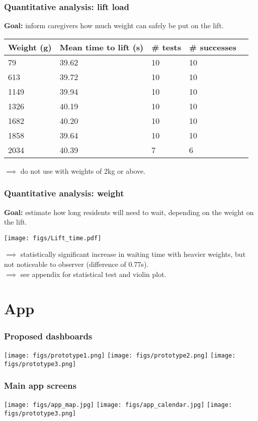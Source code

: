 \documentclass{beamer}
\begin{document}
\begin{frame}
  \frametitle{Quantitative analysis: lift load}
  {\bf Goal: } inform caregivers how much weight can safely be put on the lift.
  \begin{center}
    \begin{tabular}{llllr}
      {\bf Weight (g)} & {\bf Mean time to lift (s)} & {\bf \# tests} & {\bf \# successes}\\
      \hline
      79 & 39.62  & 10 & 10  \\
      613 & 39.72 & 10 & 10 \\
      1149 & 39.94 & 10 & 10  \\
      1326 & 40.19 & 10 & 10 \\
      1682 & 40.20 & 10 & 10 \\
      1858 & 39.64 & 10 & 10  \\
      2034 & 40.39 & 7 & 6
    \end{tabular}
  \end{center}
  $\implies$ do not use with weights of 2kg or above. 
\end{frame}

\begin{frame}
  \frametitle{Quantitative analysis: weight}
  {\bf Goal: } estimate how long residents will need to wait, depending on the weight on the lift.
  \begin{center}
    \texttt{[image: figs/Lift\_time.pdf]}
  \end{center}
  $\implies$ statistically significant increase in waiting time with heavier weights, but not noticeable to observer (difference of 0.77s). \\
  $\implies$ see appendix for statistical test and violin plot.
\end{frame}

\section{App}
\begin{frame}
  \frametitle{Proposed dashboards}
  \begin{center}
    \texttt{[image: figs/prototype1.png]}
    \texttt{[image: figs/prototype2.png]}
    \texttt{[image: figs/prototype3.png]}
  \end{center}
\end{frame}

\begin{frame}
  \frametitle{Main app screens}
    \begin{center}
    \texttt{[image: figs/app\_map.jpg]}
    \texttt{[image: figs/app\_calendar.jpg]}
    \texttt{[image: figs/prototype3.png]}
  \end{center}
\end{frame}
\end{document}
